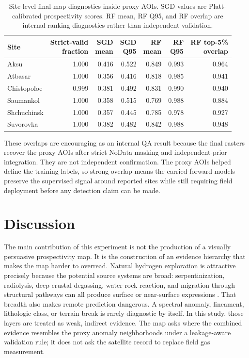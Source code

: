 \documentclass[numrefs]{interact}
\let\cite\citep
\theoremstyle{plain}%
\theoremstyle{definition}
\theoremstyle{remark}
\begin{document}
\begin{table}[t]
\centering
\caption{Site-level final-map diagnostics inside proxy AOIs. SGD values are Platt-calibrated prospectivity scores. RF mean, RF Q95, and RF overlap are internal ranking diagnostics rather than independent validation.}
\label{tab:site-review-summary}
\begin{tabular}{lrrrrrr}
\toprule
Site & \shortstack{Strict-valid\\fraction} & \shortstack{SGD\\mean} & \shortstack{SGD\\Q95} & \shortstack{RF\\mean} & \shortstack{RF\\Q95} & \shortstack{RF top-5\%\\overlap} \\
\midrule
Aksu & 1.000 & 0.416 & 0.522 & 0.849 & 0.993 & 0.964 \\
Atbasar & 1.000 & 0.356 & 0.416 & 0.818 & 0.985 & 0.941 \\
Chistopoloe & 0.999 & 0.381 & 0.492 & 0.831 & 0.990 & 0.940 \\
Saumankol & 1.000 & 0.358 & 0.515 & 0.769 & 0.988 & 0.884 \\
Shchuchinsk & 1.000 & 0.357 & 0.445 & 0.785 & 0.978 & 0.927 \\
Suvorovka & 1.000 & 0.382 & 0.482 & 0.842 & 0.988 & 0.948 \\
\bottomrule
\end{tabular}
\end{table}

These overlaps are encouraging as an internal QA result because the final rasters recover the proxy AOIs after strict NoData masking and independent-prior integration. They are not independent confirmation. The proxy AOIs helped define the training labels, so strong overlap means the carried-forward models preserve the supervised signal around reported sites while still requiring field deployment before any detection claim can be made.

\section{Discussion}
The main contribution of this experiment is not the production of a visually persuasive prospectivity map. It is the construction of an evidence hierarchy that makes the map harder to overread. Natural hydrogen exploration is attractive precisely because the potential source systems are broad: serpentinization, radiolysis, deep crustal degassing, water-rock reaction, and migration through structural pathways can all produce surface or near-surface expressions \cite{zgonnik2020occurrence}. That breadth also makes remote prediction dangerous. A spectral anomaly, lineament, lithologic class, or terrain break is rarely diagnostic by itself. In this study, those layers are treated as weak, indirect evidence. The map asks where the combined evidence resembles the proxy anomaly neighborhoods under a leakage-aware validation rule; it does not ask the satellite record to replace field gas measurement.
\end{document}
